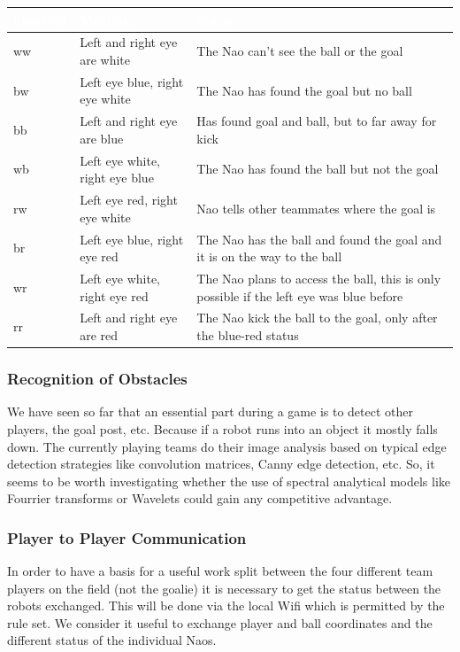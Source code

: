 \documentclass[12pt]{article}
\theoremstyle{definition}
\begin{document}
\begin{tabular}{|p{.21\linewidth}|p{.3\linewidth}|p{.38\linewidth}|}
\hline
\cellcolor[gray]{0.5}\textcolor{white}{Shortcut} & \cellcolor[gray]{0.45}\textcolor{white}{Meaning} & \cellcolor[gray]{0.5}\textcolor{white}{Status}\\ \hline
ww&Left and right eye are white&The Nao can't see the ball or the goal\\ \hline
bw&Left eye blue, right eye white&The Nao has found the goal but no ball \\ \hline
bb&Left and right eye are blue&Has found goal and ball, but to far away for kick \\ \hline
wb&Left eye white, right eye blue&The Nao has found the ball but not the goal\\ \hline 
rw&Left eye red, right eye white&Nao tells other teammates where the goal is \\ \hline
br&Left eye blue, right eye red&The Nao has the ball and found the goal and it is on the way to the ball\\ \hline
wr&Left eye white, right eye red&The Nao plans to access the ball, this is only possible if the left eye was blue before\\ \hline
rr&Left and right eye are red&The Nao kick the ball to the goal, only after the blue-red status\\ \hline
\end{tabular}

\subsubsection{Recognition of Obstacles}
We have seen so far that an essential part during a game is to detect other players, the goal post, etc. Because if a robot runs into an object it mostly falls down. The currently playing teams do their image analysis based on typical edge detection strategies like convolution matrices, Canny edge detection, etc. So, it seems to be worth investigating whether the use of spectral analytical models like Fourrier transforms or Wavelets could gain any competitive advantage.

\subsubsection{Player to Player Communication}
In order to have a basis for a useful work split between the four different team players on the field (not the goalie) it is necessary to get the status between the robots exchanged. This will be done via the local Wifi which is permitted by the rule set. We consider it useful to exchange player and ball coordinates and the different status of the individual Naos.
\end{document}
